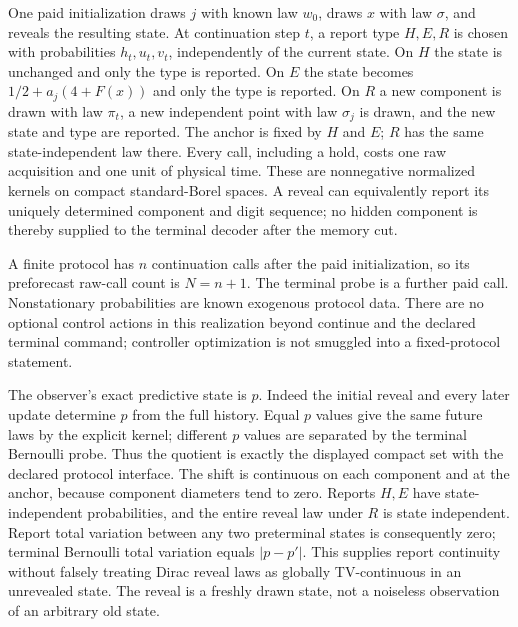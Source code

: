 One paid initialization draws $j$ with known law $w_0$, draws $x$ with law $\sigma$, and reveals the resulting state. At continuation step $t$, a report type $H,E,R$ is chosen with probabilities $h_t,u_t,v_t$, independently of the current state. On $H$ the state is unchanged and only the type is reported. On $E$ the state becomes $1/2+a_j(4+F(x))$ and only the type is reported. On $R$ a new component is drawn with law $\pi_t$, a new independent point with law $\sigma_j$ is drawn, and the new state and type are reported. The anchor is fixed by $H$ and $E$; $R$ has the same state-independent law there. Every call, including a hold, costs one raw acquisition and one unit of physical time. These are nonnegative normalized kernels on compact standard-Borel spaces. A reveal can equivalently report its uniquely determined component and digit sequence; no hidden component is thereby supplied to the terminal decoder after the memory cut.

A finite protocol has $n$ continuation calls after the paid initialization, so its preforecast raw-call count is $N=n+1$. The terminal probe is a further paid call. Nonstationary probabilities are known exogenous protocol data. There are no optional control actions in this realization beyond continue and the declared terminal command; controller optimization is not smuggled into a fixed-protocol statement.

The observer's exact predictive state is $p$. Indeed the initial reveal and every later update determine $p$ from the full history. Equal $p$ values give the same future laws by the explicit kernel; different $p$ values are separated by the terminal Bernoulli probe. Thus the quotient is exactly the displayed compact set with the declared protocol interface. The shift is continuous on each component and at the anchor, because component diameters tend to zero. Reports $H,E$ have state-independent probabilities, and the entire reveal law under $R$ is state independent. Report total variation between any two preterminal states is consequently zero; terminal Bernoulli total variation equals $|p-p'|$. This supplies report continuity without falsely treating Dirac reveal laws as globally TV-continuous in an unrevealed state. The reveal is a freshly drawn state, not a noiseless observation of an arbitrary old state.

